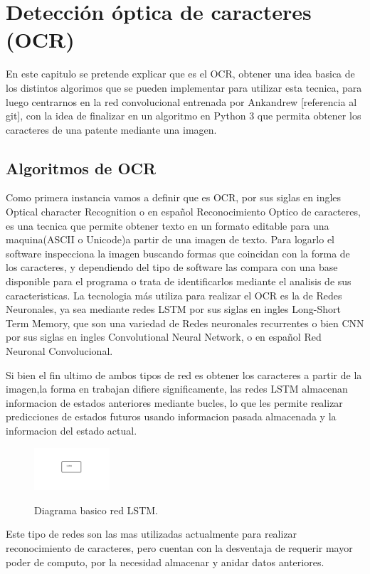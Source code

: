 \chapter{Detección óptica de caracteres (OCR)}
En este capitulo se pretende explicar que es el OCR, obtener una idea basica 
de los distintos algorimos que se pueden implementar para 
utilizar esta tecnica, para luego centrarnos en la red convolucional entrenada por 
Ankandrew [referencia al git], con la idea de finalizar en un algoritmo en Python 3 
que permita obtener los caracteres de una patente mediante una imagen.

\section{Algoritmos de OCR}
Como primera instancia vamos a definir que es OCR, por sus siglas en ingles Optical character
Recognition o en español Reconocimiento Optico de caracteres, es una tecnica que permite 
obtener texto en un formato editable para una maquina(ASCII o Unicode)a partir de una imagen 
de texto.
Para logarlo el software inspecciona la imagen buscando formas que coincidan con la forma 
de los caracteres, y dependiendo del tipo de software las compara con una base disponible
para el programa o trata de identificarlos mediante el analisis de sus caracteristicas.
La tecnologia más utiliza para realizar el OCR es la de Redes Neuronales, ya sea 
mediante redes LSTM por sus siglas en ingles Long-Short Term Memory, que son una variedad de Redes
neuronales recurrentes o bien CNN por sus siglas en ingles Convolutional Neural Network, o en español Red
Neuronal Convolucional.

Si bien el fin ultimo de ambos tipos de red es obtener los caracteres a partir de la imagen,la forma en 
trabajan difiere significamente, las redes LSTM almacenan informacion de estados anteriores mediante bucles,
lo que les permite realizar predicciones de estados futuros usando informacion pasada almacenada y la informacion
del estado actual.
\begin{figure}[h]
    \centering
    \includegraphics[width=0.25\textwidth]{imgs/LSTM-diagrama.jpg}
    \label{fig:diagrama-LSTM}
    \caption{Diagrama basico red LSTM.}
    \end{figure}
Este tipo de redes son las mas utilizadas actualmente para realizar reconocimiento de 
caracteres, pero cuentan con la desventaja de requerir mayor poder de computo, por la necesidad
almacenar y anidar datos anteriores.

